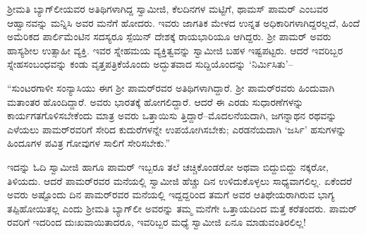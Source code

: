 ಶ್ರೀಮತಿ ಬ್ಯಾಗ್​ಲೀಯವರ ಅತಿಥಿಗಳಾಗಿದ್ದ ಸ್ವಾಮೀಜಿ, ಕೆಲದಿನಗಳ ಮಟ್ಟಿಗೆ, ಥಾಮಸ್ ಪಾಮರ್ ಎಂಬವರ ಆಹ್ವಾನವನ್ನು ಮನ್ನಿಸಿ ಅವರ ಮನೆಗೆ ಹೋದರು. ಇವರು ಜಾಗತಿಕ ಮೇಳದ ಉನ್ನತ ಅಧಿಕಾರಿಗಳಾಗಿದ್ದರಲ್ಲದೆ, ಹಿಂದೆ ಅಮೆರಿಕದ ಪಾರ್ಲಿಮೆಂಟಿನ ಸದಸ್ಯರೂ ಸ್ಪೆಯಿನ್ ದೇಶಕ್ಕೆ ರಾಯಭಾರಿಯೂ ಆಗಿದ್ದರು. ಶ್ರೀ ಪಾಮರ್ ಅವರು ಹಾಸ್ಯಶೀಲ ಉತ್ಸಾಹೀ ವ್ಯಕ್ತಿ. ಇವರ ಸ್ನೇಹಮಯ ವ್ಯಕ್ತಿತ್ವವನ್ನು ಸ್ವಾಮೀಜಿ ಬಹಳ ಇಷ್ಟಪಟ್ಟರು. ಆದರೆ ಇವರಿಬ್ಬರ ಸ್ನೇಹಸಂಬಂಧವನ್ನು ಕಂಡು ವೃತ್ತಪತ್ರಿಕೆಯೊಂದು ಅದ್ಭುತವಾದ ಸುದ್ದಿಯೊಂದನ್ನು ‘ನಿರ್ಮಿಸಿತು’–

“ಸುಂಟರಗಾಳೀ ಸಂನ್ಯಾಸಿಯು ಈಗ ಶ್ರೀ ಪಾಮರ್​ರವರ ಅತಿಥಿಗಳಾಗಿದ್ದಾರೆ. ಶ್ರೀ ಪಾಮರ್​ರವರು ಹಿಂದುವಾಗಿ ಮತಾಂತರ ಹೊಂದಿದ್ದಾರೆ. ಅವರು ಭಾರತಕ್ಕೆ ಹೋಗಲಿದ್ದಾರೆ. ಆದರೆ ಈ ಎರಡು ಸುಧಾರಣೆಗಳನ್ನು ಕಾರ್ಯಗತಗೊಳಿಸಬೇಕೆಂದು ಮಾತ್ರ ಅವರು ಒತ್ತಾಯಿಸು ತ್ತಿದ್ದಾರೆ–ಮೊದಲನೆಯದಾಗಿ, ಜಗನ್ನಾಥನ ರಥವನ್ನು ಎಳೆಯಲು ಪಾಮರ್​ರವರಿಗೆ ಸೇರಿದ ಕುದುರೆಗಳನ್ನೇ ಉಪಯೋಗಿಸಬೇಕು; ಎರಡನೆಯದಾಗಿ ‘ಜರ್ಸಿ’ ಹಸುಗಳನ್ನು ಹಿಂದೂಗಳ ಪವಿತ್ರ ಗೋವುಗಳ ಸಾಲಿಗೆ ಸೇರಿಸಬೇಕು.”

ಇದನ್ನು ಓದಿ ಸ್ವಾಮೀಜಿ ಹಾಗೂ ಪಾಮರ್ ಇಬ್ಬರೂ ತಲೆ ಚಚ್ಚಿಕೊಂಡರೋ ಅಥವಾ ಬಿದ್ದುಬಿದ್ದು ನಕ್ಕರೋ, ತಿಳಿಯದು. ಆದರೆ ಪಾಮರ್​ರವರ ಮನೆಯಲ್ಲಿ ಸ್ವಾಮೀಜಿ ಹೆಚ್ಚು ದಿನ ಉಳಿದುಕೊಳ್ಳಲು ಸಾಧ್ಯವಾಗಲಿಲ್ಲ. ಏಕೆಂದರೆ ಅವರು ಅಷ್ಟೊಂದು ದಿನ ಪಾಮರ್​ರವರ ಮನೆಯಲ್ಲಿ ಇದ್ದದ್ದರಿಂದ ತಮಗೆ ಅವರ ಆತಿಥೇಯರಾಗಿರುವ ಭಾಗ್ಯ ತಪ್ಪಿಹೋಯಿತಲ್ಲ ಎಂದು ಶ್ರೀಮತಿ ಬ್ಯಾಗ್​ಲೀ ಅವರನ್ನು ತಮ್ಮ ಮನೆಗೇ ಒತ್ತಾಯದಿಂದ ಮತ್ತೆ ಕರೆತಂದರು. ಪಾಮರ್​ರವರಿಗೆ ಇದರಿಂದ ದುಃಖವಾಯಿತಾದರೂ, ಇವರಿಬ್ಬರ ಮಧ್ಯೆ ಸ್ವಾಮೀಜಿ ಏನೂ ಮಾಡುವಂತಿರಲಿಲ್ಲ!

